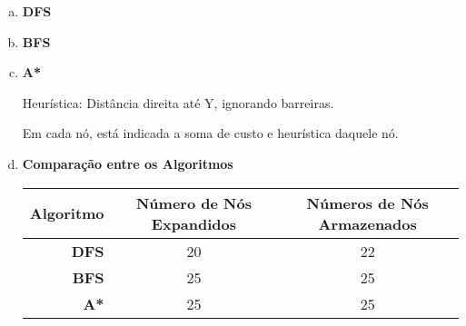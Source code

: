 \documentclass[paper=a4, fontsize=11pt]{scrartcl} %
\begin{document}
    \begin{enumerate}[(a)]
        \item \textbf{DFS}
        \par 
        \vspace{0.2cm}
        \pagebreak
        \item \textbf{BFS}
        \par 
        \vspace{0.2cm}
        \pagebreak
        \item \textbf{A*}
        \par Heurística: Distância direita até Y, ignorando barreiras.
        \par Em cada nó, está indicada a soma de custo e heurística daquele nó.
        \par 
        \vspace{0.2cm}
        \pagebreak
        \item \textbf{Comparação entre os Algoritmos}
        \par \begin{table}[h!]
            \begin{center}
              \label{tab:table1}
              \begin{tabular}{r|c|c} %
                \textbf{Algoritmo} & \textbf{Número de Nós Expandidos} & \textbf{Números de Nós Armazenados}\\
                \hline
                \textbf{DFS} & 20 & 22 \\
                \textbf{BFS} & 25 & 25 \\
                \textbf{A*}  & 25 & 25 \\
              \end{tabular}
            \end{center}
          \end{table}
        \vspace{0.2cm}
    \end{enumerate}


    
\end{document}
